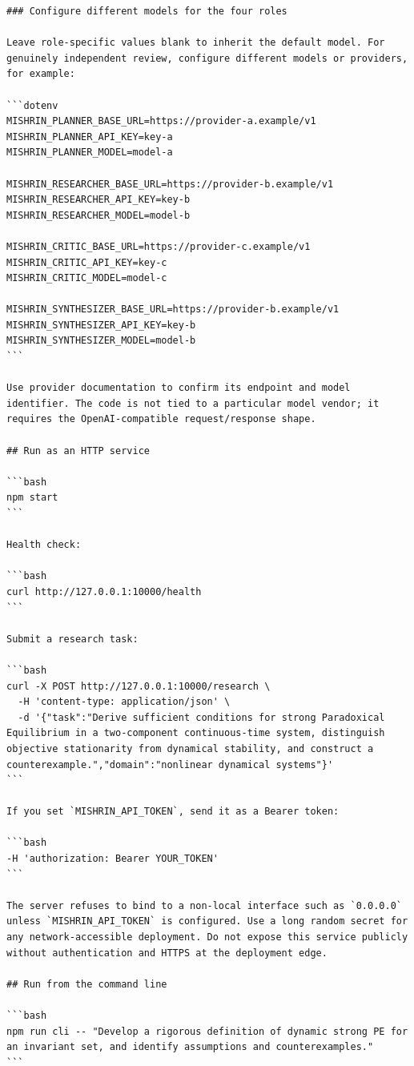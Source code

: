 \documentclass[10pt,a4paper]{article}
\begin{document}
\begin{lstlisting}
### Configure different models for the four roles

Leave role-specific values blank to inherit the default model. For genuinely independent review, configure different models or providers, for example:

```dotenv
MISHRIN_PLANNER_BASE_URL=https://provider-a.example/v1
MISHRIN_PLANNER_API_KEY=key-a
MISHRIN_PLANNER_MODEL=model-a

MISHRIN_RESEARCHER_BASE_URL=https://provider-b.example/v1
MISHRIN_RESEARCHER_API_KEY=key-b
MISHRIN_RESEARCHER_MODEL=model-b

MISHRIN_CRITIC_BASE_URL=https://provider-c.example/v1
MISHRIN_CRITIC_API_KEY=key-c
MISHRIN_CRITIC_MODEL=model-c

MISHRIN_SYNTHESIZER_BASE_URL=https://provider-b.example/v1
MISHRIN_SYNTHESIZER_API_KEY=key-b
MISHRIN_SYNTHESIZER_MODEL=model-b
```

Use provider documentation to confirm its endpoint and model identifier. The code is not tied to a particular model vendor; it requires the OpenAI-compatible request/response shape.

## Run as an HTTP service

```bash
npm start
```

Health check:

```bash
curl http://127.0.0.1:10000/health
```

Submit a research task:

```bash
curl -X POST http://127.0.0.1:10000/research \
  -H 'content-type: application/json' \
  -d '{"task":"Derive sufficient conditions for strong Paradoxical Equilibrium in a two-component continuous-time system, distinguish objective stationarity from dynamical stability, and construct a counterexample.","domain":"nonlinear dynamical systems"}'
```

If you set `MISHRIN_API_TOKEN`, send it as a Bearer token:

```bash
-H 'authorization: Bearer YOUR_TOKEN'
```

The server refuses to bind to a non-local interface such as `0.0.0.0` unless `MISHRIN_API_TOKEN` is configured. Use a long random secret for any network-accessible deployment. Do not expose this service publicly without authentication and HTTPS at the deployment edge.

## Run from the command line

```bash
npm run cli -- "Develop a rigorous definition of dynamic strong PE for an invariant set, and identify assumptions and counterexamples."
```


\end{lstlisting}
\end{document}
